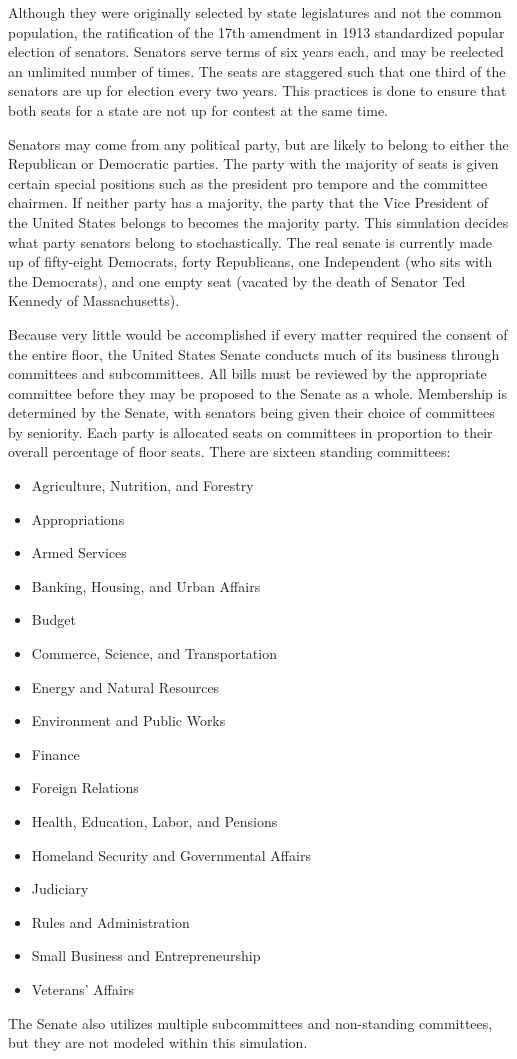 \documentclass{sig-alternate}
\newcounter{over}
\newenvironment{smallitem}
 {\setlength{\topsep}{0pt}
  \setlength{\partopsep}{0pt}
  \setlength{\parskip}{0pt}
  \begin{itemize}
   \setlength{\leftmargin}{.2in}
  \setlength{\parsep}{0pt}
  \setlength{\parskip}{0pt}
  \setlength{\itemsep}{0pt}}
 {\end{itemize}}
\newcommand{\bi}{\begin{smallitem}}
\newcommand{\ei}{\end{smallitem}}
\begin{document}
Although they were originally selected by state legislatures and not the common population, the ratification of the 17th amendment in 1913 standardized popular election of senators. Senators serve terms of six years each, and may be reelected an unlimited number of times. The seats are staggered such that one third of the senators are up for election every two years. This practices is done to ensure that both seats for a state are not up for contest at the same time. 

Senators may come from any political party, but are likely to belong to either the Republican or Democratic parties. The party with the majority of seats is given certain special positions such as the president pro tempore and the committee chairmen. If neither party has a majority, the party that the Vice President of the United States belongs to becomes the majority party. This simulation decides what party senators belong to stochastically. The real senate is currently made up of fifty-eight Democrats, forty Republicans, one Independent (who sits with the Democrats), and one empty seat (vacated by the death of Senator Ted Kennedy of Massachusetts).

Because very little would be accomplished if every matter required the consent of the entire floor, the United States Senate conducts much of its business through committees and subcommittees. All bills must be reviewed by the appropriate committee before they may be proposed to the Senate as a whole. Membership is determined by the Senate, with senators being given their choice of committees by seniority. Each party is allocated seats on committees in proportion to their overall percentage of floor seats. There are sixteen standing committees:
\bi
\item Agriculture, Nutrition, and Forestry 
\item Appropriations 
\item Armed Services
\item Banking, Housing, and Urban Affairs
\item Budget
\item Commerce, Science, and Transportation
\item Energy and Natural Resources
\item Environment and Public Works
\item Finance
\item Foreign Relations
\item Health, Education, Labor, and Pensions
\item Homeland Security and Governmental Affairs
\item Judiciary
\item Rules and Administration
\item Small Business and Entrepreneurship 
\item Veterans' Affairs 
\ei
The Senate also utilizes multiple subcommittees and non-standing committees, but they are not modeled within this simulation. 
\end{document}

